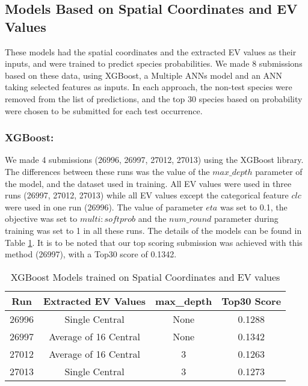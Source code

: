 \documentclass[runningheads]{llncs}
\begin{document}
\subsection{Models Based on Spatial Coordinates and EV Values}
These models had the spatial coordinates and the extracted EV values as their inputs, and were trained to predict species probabilities. We made 8 submissions based on these data, using XGBoost, a Multiple ANNs model and an ANN taking selected features as inputs. In each approach, the non-test species were removed from the list of predictions, and the top 30 species based on probability were chosen to be submitted for each test occurrence.
\subsubsection{XGBoost:} We made 4 submissions (26996, 26997, 27012, 27013) using the XGBoost library. The differences between these runs was the value of the $max\_depth$ parameter of the model, and the dataset used in training. All EV values were used in three runs (26997, 27012, 27013) while all EV values except the categorical feature $clc$ were used in one run (26996). The value of parameter $eta$ was set to 0.1, the objective was set to $multi:softprob$ and the $num\_round$ parameter during training was set to 1 in all these runs. The details of the models can be found in Table \ref{table:xgbev}. It is to be noted that our top scoring submission was achieved with this method (26997), with a Top30 score of 0.1342.
\setlength{\tabcolsep}{6pt}
\begin{table}[]
    \centering
    \setlength{\abovecaptionskip}{25pt}
    \setlength{\belowcaptionskip}{-25pt}
    \begin{tabular}{| c | c | c | c |}
         \hline
         \textbf{ Run } & \textbf{ Extracted EV Values }  & \textbf{ max\_depth } & \textbf{ Top30 Score } \\
         \hline
         26996 & Single Central & None & 0.1288 \\
         \hline
         26997 & Average of 16 Central & None & 0.1342 \\
         \hline
         27012 & Average of 16 Central & 3 & 0.1263 \\
         \hline
         27013 & Single Central & 3 & 0.1273 \\
         \hline
    \end{tabular}
    \caption{XGBoost Models trained on Spatial Coordinates and EV values}
    \label{table:xgbev}
\end{table}
\end{document}
